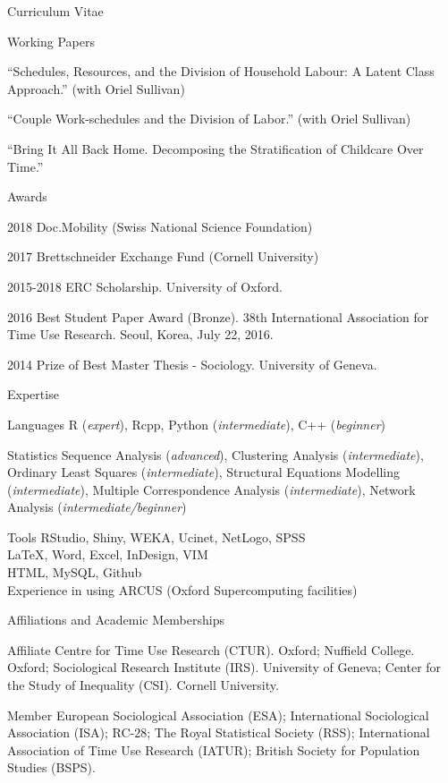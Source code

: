 \documentclass[12pt,a4paper]{article}
\newcommand*{\ac}[1]{\mbox{#1}}
\begin{document}
\begin{cv}{Curriculum Vitae}
 \begin{cvlist}{Working Papers}

 
  	\item ``Schedules, Resources, and the Division of Household Labour: A Latent Class Approach.'' (with Oriel Sullivan)
  	\item ``Couple Work-schedules and the Division of Labor.'' (with Oriel Sullivan)
  	\item ``Bring It All Back Home. Decomposing the Stratification of Childcare Over Time.''

 \end{cvlist}
 
  
  \begin{cvlist}{Awards}
  	\item[2018]  Doc.Mobility (Swiss National Science Foundation)
  	\item[2017]  Brettschneider Exchange Fund (Cornell University)
  	\item [2015-2018] ERC Scholarship. University of Oxford. 
  	\item [2016]  Best Student Paper Award (Bronze). 38th International Association for Time Use Research. Seoul, Korea, July 22, 2016. 
  	\item [2014] Prize of Best Master Thesis - Sociology.  University of Geneva. 
  \end{cvlist}
  
  \begin{cvlist}{\ac{Expertise}}
  	\item[Languages] R (\emph{expert}), Rcpp, Python (\emph{intermediate}),  C++ (\emph{beginner}) 
  	
  	\item[Statistics] Sequence Analysis (\emph{advanced}), 
  	Clustering Analysis (\emph{intermediate}), 
  	Ordinary Least Squares (\emph{intermediate}), Structural Equations Modelling (\emph{intermediate}), Multiple Correspondence Analysis (\emph{intermediate}), 
  	Network Analysis (\emph{intermediate/beginner})
  	
  	\item[Tools] RStudio, Shiny, \ac{WEKA}, Ucinet, NetLogo, \ac{SPSS} \\ \LaTeX, Word, Excel, InDesign, \ac{VIM} \\ 
  	\ac{HTML},  MySQL,  Github \\ 
  	Experience in using ARCUS (Oxford Supercomputing facilities)
  \end{cvlist}


\begin{cvlist}{Affiliations and Academic Memberships}
	\item[Affiliate] Centre for Time Use Research (CTUR). Oxford; Nuffield College. Oxford; Sociological Research Institute (IRS). University of Geneva; Center for the Study of Inequality (CSI). Cornell University. 
	\item[Member] European Sociological Association (ESA); International Sociological Association (ISA); RC-28; The Royal Statistical Society (RSS); International Association of Time Use Research (IATUR); 
	British Society for Population Studies (BSPS). 
\end{cvlist}

  \date{~January~2020}
\end{cv}
\end{document}
